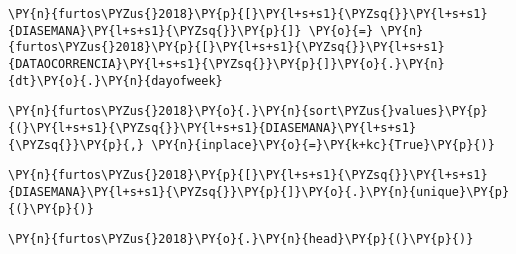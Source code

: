     \begin{tcolorbox}[breakable, size=fbox, boxrule=1pt, pad at break*=1mm,colback=cellbackground, colframe=cellborder]
\begin{Verbatim}[commandchars=\\\{\}]
\PY{n}{furtos\PYZus{}2018}\PY{p}{[}\PY{l+s+s1}{\PYZsq{}}\PY{l+s+s1}{DIASEMANA}\PY{l+s+s1}{\PYZsq{}}\PY{p}{]} \PY{o}{=} \PY{n}{furtos\PYZus{}2018}\PY{p}{[}\PY{l+s+s1}{\PYZsq{}}\PY{l+s+s1}{DATAOCORRENCIA}\PY{l+s+s1}{\PYZsq{}}\PY{p}{]}\PY{o}{.}\PY{n}{dt}\PY{o}{.}\PY{n}{dayofweek}
\end{Verbatim}
\end{tcolorbox}

    \begin{tcolorbox}[breakable, size=fbox, boxrule=1pt, pad at break*=1mm,colback=cellbackground, colframe=cellborder]
\begin{Verbatim}[commandchars=\\\{\}]
\PY{n}{furtos\PYZus{}2018}\PY{o}{.}\PY{n}{sort\PYZus{}values}\PY{p}{(}\PY{l+s+s1}{\PYZsq{}}\PY{l+s+s1}{DIASEMANA}\PY{l+s+s1}{\PYZsq{}}\PY{p}{,} \PY{n}{inplace}\PY{o}{=}\PY{k+kc}{True}\PY{p}{)}
\end{Verbatim}
\end{tcolorbox}

    \begin{tcolorbox}[breakable, size=fbox, boxrule=1pt, pad at break*=1mm,colback=cellbackground, colframe=cellborder]
\begin{Verbatim}[commandchars=\\\{\}]
\PY{n}{furtos\PYZus{}2018}\PY{p}{[}\PY{l+s+s1}{\PYZsq{}}\PY{l+s+s1}{DIASEMANA}\PY{l+s+s1}{\PYZsq{}}\PY{p}{]}\PY{o}{.}\PY{n}{unique}\PY{p}{(}\PY{p}{)}
\end{Verbatim}
\end{tcolorbox}

    \begin{tcolorbox}[breakable, size=fbox, boxrule=1pt, pad at break*=1mm,colback=cellbackground, colframe=cellborder]
\begin{Verbatim}[commandchars=\\\{\}]
\PY{n}{furtos\PYZus{}2018}\PY{o}{.}\PY{n}{head}\PY{p}{(}\PY{p}{)}
\end{Verbatim}
\end{tcolorbox}

